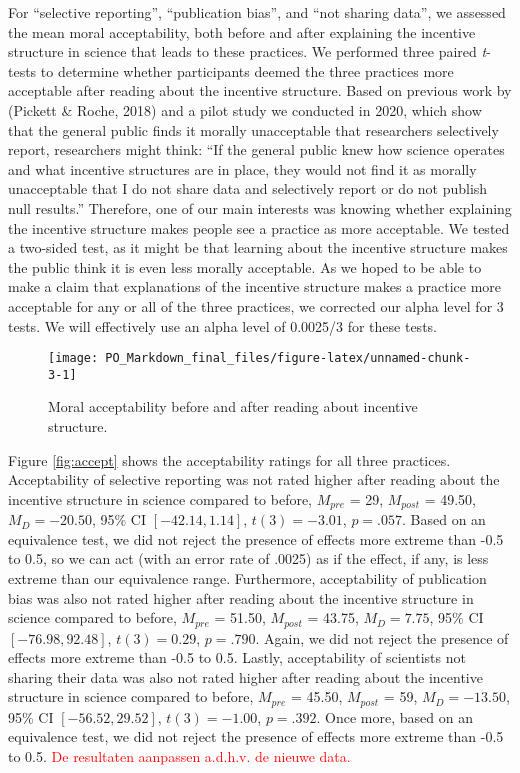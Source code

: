 \documentclass[
  man,floatsintext]{apa7}
\begin{document}
For ``selective reporting'', ``publication bias'', and ``not sharing data'',
we assessed the mean moral acceptability, both before and after
explaining the incentive structure in science that leads to these
practices. We performed three paired \emph{t}-tests to determine whether
participants deemed the three practices more acceptable after reading
about the incentive structure. Based on previous work by (Pickett \& Roche, 2018) and a pilot study we conducted in 2020, which
show that the general public finds it morally
unacceptable that researchers selectively report, researchers might
think: ``If the general public knew how science operates and what incentive
structures are in place, they would not
find it as morally unacceptable that I do not share data and selectively
report or do not publish null results.'' Therefore, one
of our main interests was knowing whether explaining the incentive structure
makes people see a practice as more acceptable. We tested a
two-sided test, as it might be that learning about the incentive structure
makes the public think it is even less morally acceptable. As we hoped to be able
to make a claim that explanations of the incentive structure makes a
practice more acceptable for any or all of the three practices, we
corrected our alpha level for 3 tests. We will effectively use an alpha level of 0.0025/3 for these
tests.

\begin{figure}
\texttt{[image: PO\_Markdown\_final\_files/figure-latex/unnamed-chunk-3-1]} \caption{Moral acceptability before and after reading about incentive structure. \label{fig:accept}}\label{fig:unnamed-chunk-3}
\end{figure}

Figure \ref{fig:accept} shows the acceptability ratings for all three practices. Acceptability of selective reporting was not rated higher after reading about the incentive structure in science compared to before, \(M_{pre}\) = 29, \(M_{post}\) = 49.50,
\(M_D = -20.50\), 95\% CI \([-42.14, 1.14]\), \(t(3) = -3.01\), \(p = .057\). Based on an equivalence test, we did not reject the presence of effects more extreme than -0.5 to 0.5, so we can act (with an error rate of .0025) as if the effect, if any, is less extreme than our equivalence range. Furthermore, acceptability of publication bias was also not rated higher after reading about the incentive structure in science compared to before, \(M_{pre}\) = 51.50, \(M_{post}\) = 43.75, \(M_D = 7.75\), 95\% CI \([-76.98, 92.48]\), \(t(3) = 0.29\), \(p = .790\). Again, we did not reject the presence of effects more extreme than -0.5 to 0.5. Lastly, acceptability of scientists not sharing their data was also not rated higher after reading about the incentive structure in science compared to before, \(M_{pre}\) = 45.50, \(M_{post}\) = 59, \(M_D = -13.50\), 95\% CI \([-56.52, 29.52]\), \(t(3) = -1.00\), \(p = .392\). Once more, based on an equivalence test, we did not reject the presence of effects more extreme than -0.5 to 0.5. \textcolor{red}{De resultaten aanpassen a.d.h.v. de nieuwe data.}
\end{document}
